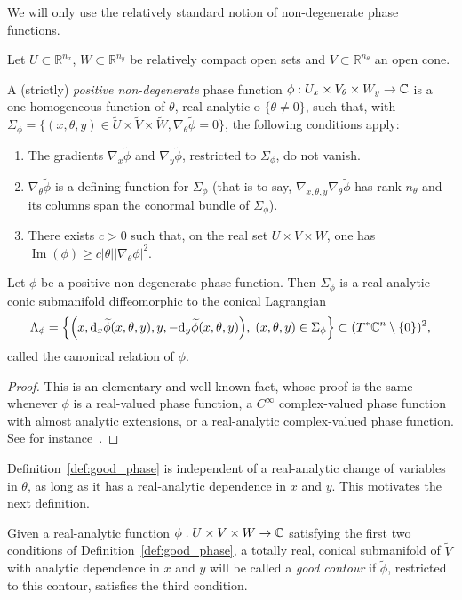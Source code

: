 \documentclass[AHL,Unicode,longabstracts,published]{cedram}
\DeclareMathOperator{\im}{Im}
\newcommand\1{\mathds{1}}
\newcommand{\R}{\mathbb{R}}
\newcommand{\C}{\mathbb{C}}
\newcommand{\dd}{\mathrm{d}}
\renewcommand*{\to}{\mathchoice{\longrightarrow}{\rightarrow}{\rightarrow}{\rightarrow}}
\let\originalleft\left
\let\originalright\right
\renewcommand{\left}{\mathopen{}\mathclose\bgroup\originalleft}
\renewcommand{\right}{\aftergroup\egroup\originalright}
\begin{document}
We will only use the relatively standard notion of non-degenerate phase functions.
\begin{defi}\label{def:good_phase}
Let $U\subset \R^{n_x}$, $W\subset
\R^{n_y}$ be relatively compact open sets and $V\subset
\R^{n_{\theta}}$ an open cone.

A (strictly) \emph{positive non-degenerate} phase function $\phi:U_x\times V_{\theta}\times W_y\to \C$ is a one-homogeneous function of $\theta$, real-analytic o $\{\theta\neq 0\}$, such that, with $\Sigma_{\phi}=\{(x,\theta,y)\in \widetilde{U}\times
\widetilde{V}\times \widetilde{W},
\nabla_{\theta}\widetilde{\phi}=0\}$, the following conditions apply:
\begin{enumerate}
\item\label{defi3.12.1} The gradients $\nabla_x\widetilde{\phi}$ and $\nabla_y\widetilde{\phi}$, restricted to $\Sigma_{\phi}$, do not vanish.
\item\label{defi3.12.2} $\nabla_{\theta}\widetilde{\phi}$ is a defining function for $\Sigma_{\phi}$ (that is to say, $\nabla_{x,\theta,y}\nabla_{\theta}\widetilde{\phi}$ has rank $n_{\theta}$ and its columns span the conormal bundle of $\Sigma_{\phi}$).
\item\label{defi3.12.3} There exists $c>0$ such that, on the real set $U\times V\times W$, one has $\im(\phi)\geq c|\theta||\nabla_{\theta}\phi|^2$.
\end{enumerate}
\end{defi}

\begin{prop}\label{prop:lagr}
Let $\phi$ be a positive non-degenerate phase function. Then $\Sigma_{\phi}$ is a real-analytic conic submanifold diffeomorphic to the conical Lagrangian
\[
\Lambda_{\phi}=\left\{\left(x,\dd_x\widetilde\phi(x,\theta,y),y,-\dd_y\widetilde\phi(x,\theta,y)\right),\;(x,\theta,y)\in
\Sigma_{\phi}\right\}\subset (T^*\C^n\setminus \{0\})^2,
\]
called the canonical relation of $\phi$.
\end{prop}
\begin{proof}
This is an elementary and well-known fact, whose proof is the same whenever $\phi$ is a real-valued phase function, a $C^{\infty}$ complex-valued phase function with almost analytic extensions, or a real-analytic complex-valued phase function. See for instance~\cite[Proposition~25.4.4]{hormander_analysis_1985}.
\end{proof}

Definition~\ref{def:good_phase} is independent of a real-analytic change of variables in $\theta$, as long as it has a real-analytic dependence in $x$ and $y$. This motivates the next definition.
\begin{defi}\label{def:good_contour}
Given a real-analytic function $\phi:U\times V\times W\to \C$ satisfying the first two conditions of Definition~\ref{def:good_phase}, a totally real, conical submanifold of $\widetilde{V}$ with analytic dependence in $x$ and $y$ will be called a \emph{good contour} if $\widetilde{\phi}$, restricted to this contour, satisfies the third condition.
\end{defi}
\end{document}
